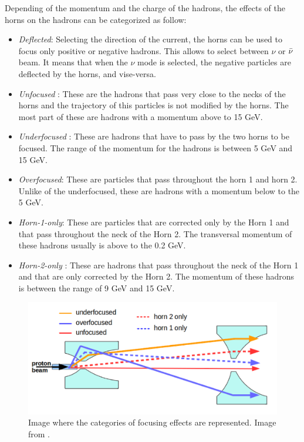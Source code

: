 Depending of the momentum and the charge of the hadrons, the effects of the horns on the hadrons can be categorized as follow:

\begin{itemize}
    \item \textit{Deflected}: Selecting the direction of the current, the horns can be used to focus only positive or negative hadrons. This allows to select between $\nu$ or $\Bar{\nu}$ beam. It means that when the $\nu$ mode is selected, the negative particles are deflected by the horns, and vise-versa.
    \item \textit{Unfocused} : These are the hadrons that pass very close to the necks of the horns and the trajectory of this particles is not modified by the horns. The most part of these are hadrons with a momentum above to 15 GeV. 
    \item \textit{Underfocused} : These are hadrons that have to pass by the two horns to be focused. The range of the momentum for the hadrons is between 5 GeV and 15 GeV.
    \item \textit{Overfocused}: These are particles that pass throughout the horn 1 and horn 2. Unlike of the underfocused, these are hadrons with a momentum below to the 5 GeV. 
    \item \textit{Horn-1-only}: These are particles that are corrected only by the Horn 1 and that pass throughout the neck of the Horn 2. The transversal momentum of these hadrons usually is above to the 0.2 GeV.
    \item \textit{Horn-2-only} : These are hadrons that pass throughout the neck of the Horn 1 and that are only corrected by the Horn 2. The momentum of these hadrons is between the range of 9 GeV and 15 GeV.
\end{itemize}

\begin{figure}[!htb]
\centering
\includegraphics[scale=0.33]{Figures/Chapter2/FocusingComponents.png}
        \caption{Image where the categories of focusing effects are represented. Image from \cite{LeoThesis}.} 
\label{fig:MnvExp:NuMI:NuMIFocusingComponents}
\end{figure}


